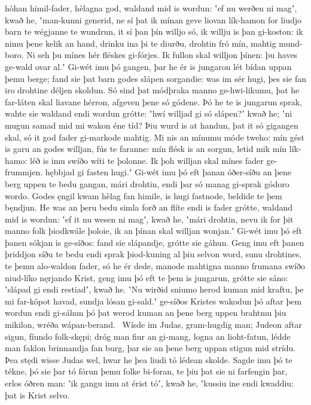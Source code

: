 hòhan himil-fader, hèlagna god,
waldand mid is wordun: ʽef nu werðen ni magʼ, kwað he,
ʽman-kunni generid, ne sí þat ik mínan geve
liovan lík-hamon for liudjo barn
te wégjanne te wundrun, it sí þan þín willjo só,
ik willju is þan gi-koston: ik nimu þene kelik an hand,
drinku ina þi te diurðu, drohtin fró mín,
mahtig mund-boro. Ni seh þu mínes hér
fléskes gi-fórjes. Ik fullon skal
willjon þínen: þu haves ge-wald ovar al.ʼ
Gi-wét imu þó gangen, þar he ér is jungaron lét
bídan uppan þemu berge; fand sie þat barn godes
slápen sorgandie: was im sér hugi,
þes sie fan iro drohtine déljen skoldun.
Só sind þat módþraka manno ge-hwi-likumu,
þat he far-láten skal liavane hérron,
afgeven þene só gódene. Þó he te is jungarun sprak,
wahte sie waldand endi wordun grótte:
ʽhwí willjad gi só slápen?ʼ kwað he; ʽni mugun samad mid mi
wakon éne tíd? Þiu wurd is at handun,
þat it só gigangen skal, só it god fader
gi-markode mahtig. Mi nis an mínumu móde tweho:
mín gést is garu an godes willjan,
fús te faranne: mín flésk is an sorgun,
letid mik mín lík-hamo: léð is imu swíðo
wíti te þolonne. Ik þoh willjan skal
mínes fader ge-frummjen. hębbjad gi fasten hugi.ʼ
Gi-wét imu þó eft þanan óðer-síðu
an þene berg uppen te bedu gangan,
mári drohtin, endi þar só manag gi-sprak
gódoro wordo. Godes ęngil kwam
hèlag fan himile, is hugi fastnode,
beldide te þem bęndjun. He was an þeru bedu simla
forð an flíte endi is fader grótte,
waldand mid is wordun: ʽef it nu wesen ni magʼ, kwað he,
ʽmári drohtin, nevu ik for þit manno folk
þiodkwále þoloie, ik an þínan skal
willjan wonjan.ʼ Gi-wét imu þó eft þanen
sókjan is ge-síðos: fand sie slápandje,
grótte sie gáhun. Geng imu eft þanen
þriddjon síðu te bedu endi sprak þiod-kuning
al þiu selvon word, sunu drohtines,
te þemu alo-waldon fader, só he ér dede,
manode mahtigna manno frumana
swíðo niud-líko nęrjando Krist,
geng imu þó eft te þem is jungarun, grótte sie sáno:
ʽslápad gi endi restiadʼ, kwað he. ʽNu wirðid sniumo herod
kuman mid kraftu, þe mi far-kópot havad,
sundja lósan gi-sald.ʼ ge-síðos Kristes
wakodun þó aftar þem wordun endi gi-sáhun þó þat werod kuman
an þene berg uppen brahtmu þiu mikilon,
wréða wápan-berand. \hld\ Wísde im Judas,
gram-hugdig man; Judeon aftar sigun,
fíundo folk-skępi; dróg man fiur an gi-mang,
logna an lioht-fatun, lédde man faklon
brinnandja fan burg, þar sie an þene berg uppan
stigun mid strídu. Þea stędi wisse Judas wel,
hwar he þea liudi tó lédean skolde.
Sagde imu þó te tékne, þó sie þar tó fórun
þemu folke bi-foran, te þiu þat sie ni farfengin þar,
erlos óðren man: ʽik gangu imu at érist tóʼ, kwað he,
ʽkussiu ine endi kwaddiu: þat is Krist selvo.
